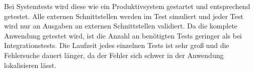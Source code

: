 Bei Systemtests wird diese wie ein Produktivsystem
gestartet und entsprechend getestet. 
Alle externen Schnittstellen werden im Test simuliert und jeder Test wird nur an Ausgaben an externen Schnittstellen validiert.
Da die komplete Anwendung getestet wird, ist die Anzahl an benötigten Tests geringer als bei Integrationstests. 
Die Laufzeit jedes einzelnen Tests ist sehr groß 
und die Fehlersuche dauert länger, da der Fehler sich schwer in der Anwendung lokalisieren lässt.